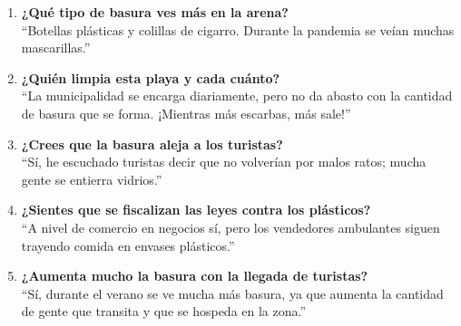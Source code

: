 \documentclass[12pt, letterpaper]{article}
\begin{document}
\vspace{0.5cm}

\begin{enumerate}
	\item \textbf{¿Qué tipo de basura ves más en la arena?}\\
	      ``Botellas plásticas y colillas de cigarro. Durante la pandemia
	      se veían muchas mascarillas.''

	\item \textbf{¿Quién limpia esta playa y cada cuánto?}\\
	      ``La municipalidad se encarga diariamente, pero no da abasto
	      con la cantidad de basura que se forma. ¡Mientras más escarbas, más sale!''

	\item \textbf{¿Crees que la basura aleja a los turistas?}\\
	      ``Sí, he escuchado turistas decir que no volverían por malos ratos;
	      mucha gente se entierra vidrios.''

	\item \textbf{¿Sientes que se fiscalizan las leyes contra los plásticos?}\\
	      ``A nivel de comercio en negocios sí, pero los vendedores ambulantes
	      siguen trayendo comida en envases plásticos.''

	\item \textbf{¿Aumenta mucho la basura con la llegada de turistas?}\\
	      ``Sí, durante el verano se ve mucha más basura, ya que aumenta
	      la cantidad de gente que transita y que se hospeda en la zona.''
\end{enumerate}
\end{document}
